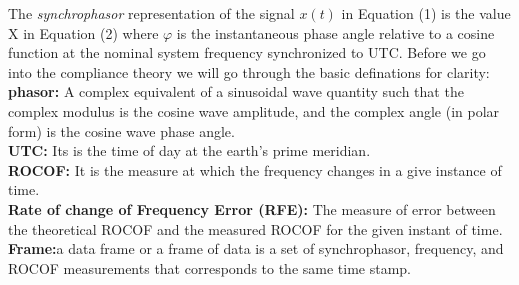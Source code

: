 The \textit{synchrophasor} representation of the signal $x(t)$ in Equation (1) is the value X in Equation (2) where $\varphi$ is the instantaneous phase angle relative to a cosine function at the nominal system frequency synchronized to UTC. Before we go into the compliance theory we will go through the basic definations for clarity:\\
\textbf{phasor:} A complex equivalent of a sinusoidal wave quantity such that the complex modulus is the cosine wave amplitude, and the complex angle (in polar form) is the cosine wave phase angle.\\
\textbf{UTC:} Its is the time of day at the earth's prime meridian.\\
\textbf{ROCOF:} It is the measure at which the frequency changes in a give instance of time.\\
\textbf{Rate of change of Frequency Error (RFE):} The measure of error between the theoretical ROCOF and the measured ROCOF for the given instant of time.\\
\textbf{Frame:}a data frame or a frame of data is a set of synchrophasor, frequency, and ROCOF measurements that corresponds to the same time stamp.\\